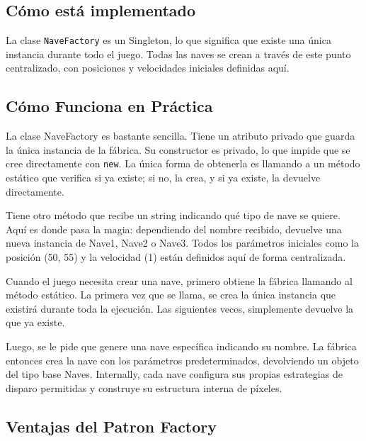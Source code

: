 \documentclass[12pt]{article}
\begin{document}
\subsection{Cómo está implementado}

La clase \texttt{NaveFactory} es un Singleton, lo que significa que existe una única instancia durante todo el juego. Todas las naves se crean a través de este punto centralizado, con posiciones y velocidades iniciales definidas aquí.

\subsection{Cómo Funciona en Práctica}

La clase NaveFactory es bastante sencilla. Tiene un atributo privado que guarda la única instancia de la fábrica. Su constructor es privado, lo que impide que se cree directamente con \texttt{new}. La única forma de obtenerla es llamando a un método estático que verifica si ya existe; si no, la crea, y si ya existe, la devuelve directamente.

Tiene otro método que recibe un string indicando qué tipo de nave se quiere. Aquí es donde pasa la magia: dependiendo del nombre recibido, devuelve una nueva instancia de Nave1, Nave2 o Nave3. Todos los parámetros iniciales como la posición (50, 55) y la velocidad (1) están definidos aquí de forma centralizada.

Cuando el juego necesita crear una nave, primero obtiene la fábrica llamando al método estático. La primera vez que se llama, se crea la única instancia que existirá durante toda la ejecución. Las siguientes veces, simplemente devuelve la que ya existe.

Luego, se le pide que genere una nave específica indicando su nombre. La fábrica entonces crea la nave con los parámetros predeterminados, devolviendo un objeto del tipo base Naves. Internally, cada nave configura sus propias estrategias de disparo permitidas y construye su estructura interna de píxeles.

\subsection{Ventajas del Patron Factory}
\end{document}
